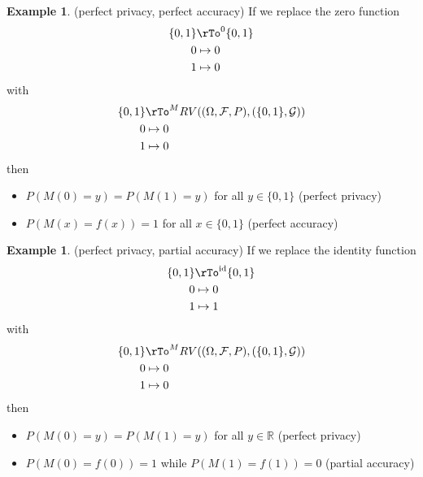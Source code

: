 \documentclass[12pt]{amsart}
\theoremstyle{definition}
\newtheorem{example}[theorem]{Example}
\begin{document}
\begin{example} \label{perfect_privacy_perfect_accuracy} (perfect privacy, perfect accuracy) If we replace the zero function
\begin{align*}
\{0, 1\} & \rTo^0 \{0, 1\} \\
0 & \mapsto 0 \\
1 & \mapsto 0 \\
\end{align*}
with
\begin{align*}
\{0, 1\} & \rTo^M RV((\Omega, \mathcal{F}, P), (\{0, 1\}, \mathcal{G})) \\
0 & \mapsto 0 \\
1 & \mapsto 0 \\
\end{align*}
then
\begin{itemize}
\item $P(M(0) = y) = P(M(1) = y)$ for all $y \in \{0, 1\}$ (perfect privacy)
\item $P(M(x) = f(x)) = 1$ for all $x \in \{0, 1\}$ (perfect accuracy)
\end{itemize}
\end{example}

\begin{example} \label{perfect_privacy_partial_accuracy} (perfect privacy, partial accuracy) If we replace the identity function
\begin{align*}
\{0, 1\} & \rTo^{\text{id}} \{0, 1\} \\
0 & \mapsto 0 \\
1 & \mapsto 1 \\
\end{align*}
with
\begin{align*}
\{0, 1\} & \rTo^M RV((\Omega, \mathcal{F}, P), (\{0, 1\}, \mathcal{G})) \\
0 & \mapsto 0 \\
1 & \mapsto 0 \\
\end{align*}
then
\begin{itemize}
\item $P(M(0) = y) = P(M(1) = y)$ for all $y \in \mathbb{R}$ (perfect privacy)
\item $P(M(0) = f(0)) = 1$ while $P(M(1) = f(1)) = 0$ (partial accuracy)
\end{itemize}
\end{example}
\end{document}
